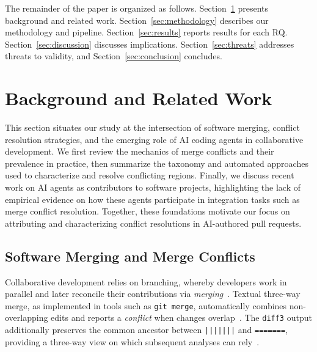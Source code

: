 \documentclass[sigconf,anonymous]{acmart}
\begin{document}
The remainder of the paper is organized as follows. Section~\ref{sec:background} presents background and related work. Section~\ref{sec:methodology} describes our methodology and pipeline. Section~\ref{sec:results} reports results for each RQ. Section~\ref{sec:discussion} discusses implications. Section~\ref{sec:threats} addresses threats to validity, and Section~\ref{sec:conclusion} concludes.

\section{Background and Related Work}
\label{sec:background}

This section situates our study at the intersection of software merging, conflict resolution strategies, and the emerging role of AI coding agents in collaborative development. We first review the mechanics of merge conflicts and their prevalence in practice, then summarize the taxonomy and automated approaches used to characterize and resolve conflicting regions. Finally, we discuss recent work on AI agents as contributors to software projects, highlighting the lack of empirical evidence on how these agents participate in integration tasks such as merge conflict resolution. Together, these foundations motivate our focus on attributing and characterizing conflict resolutions in AI-authored pull requests.

\subsection{Software Merging and Merge Conflicts}
\label{sec:bg-merging}

Collaborative development relies on branching, whereby developers work in parallel and later reconcile their contributions via \emph{merging}~\cite{mens2002survey}. Textual three-way merge, as implemented in tools such as \texttt{git merge}, automatically combines non-overlapping edits and reports a \emph{conflict} when changes overlap~\cite{mens2002survey,ghiotto2020nature,cavalcanti2019}. The \texttt{diff3} output additionally preserves the common ancestor between \verb+|||||||+ and \verb|=======|, providing a three-way view on which subsequent analyses can rely~\cite{dong2023mergegen,dinella2022deepmerge}.
\end{document}
